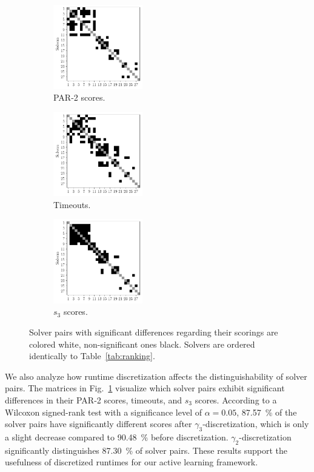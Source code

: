 \documentclass[sn-basic, Numbered]{sn-jnl} %
\begin{document}
\begin{figure}[p]
	\centering
	\begin{subfigure}{0.32\textwidth}
		\centering
		\includegraphics[width=3.9cm]{plots/par2sigdiff.pdf}
		\caption{PAR-2 scores.}
	\end{subfigure}
	\begin{subfigure}{0.32\textwidth}
		\centering
		\includegraphics[width=3.9cm]{plots/timeoutsigdiff.pdf}
		\caption{Timeouts.}
	\end{subfigure}
	\begin{subfigure}{0.32\textwidth}
		\centering
		\includegraphics[width=3.9cm]{plots/s3sigdiff.pdf}
		\caption{$s_3$ scores.}
	\end{subfigure}
	\caption{Solver pairs with significant differences regarding their scorings are colored white, non-significant ones black. Solvers are ordered identically to Table~\ref{tab:ranking}.}
	\label{fig:solver-confusion-matrices}
\end{figure}

We also analyze how runtime discretization affects the distinguishability of solver pairs.
The matrices in Fig.~\ref{fig:solver-confusion-matrices} visualize which solver pairs exhibit significant differences in their PAR-2 scores, timeouts, and $s_3$ scores.
According to a Wilcoxon signed-rank test with a significance level of $\alpha = 0.05$, \SI{87.57}{\%} of the solver pairs have significantly different scores after $\gamma_3$-discretization, which is only a slight decrease compared to \SI{90.48}{\%} before discretization.
$\gamma_2$-discretization significantly distinguishes \SI{87.30}{\%} of solver pairs.
These results support the usefulness of discretized runtimes for our active learning framework.
\end{document}
